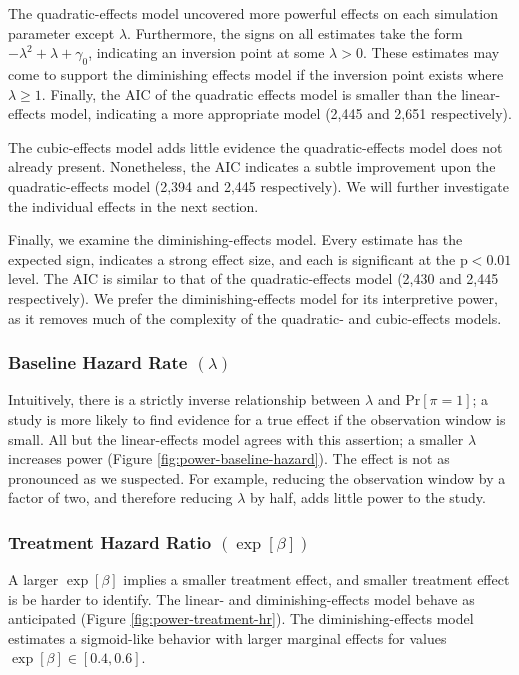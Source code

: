The quadratic-effects model uncovered more powerful effects on each simulation parameter except $\lambda$. Furthermore, the signs on all estimates take the form $-\lambda^2 + \lambda + \gamma_0$, indicating an inversion point at some $\lambda > 0$. These estimates may come to support the diminishing effects model if the inversion point exists where $\lambda \geq 1$. Finally, the AIC of the quadratic effects model is smaller than the linear-effects model, indicating a more appropriate model (2,445 and 2,651 respectively).

The cubic-effects model adds little evidence the quadratic-effects model does not already present. Nonetheless, the AIC indicates a subtle improvement upon the quadratic-effects model (2,394 and 2,445 respectively). We will further investigate the individual effects in the next section. 

Finally, we examine the diminishing-effects model. Every estimate has the expected sign, indicates a strong effect size, and each is significant at the $\text{p} < 0.01$ level. The AIC is similar to that of the quadratic-effects model (2,430 and 2,445 respectively). We prefer the diminishing-effects model for its interpretive power, as it removes much of the complexity of the quadratic- and cubic-effects models.

\subsubsection{Baseline Hazard Rate $(\lambda)$}

Intuitively, there is a strictly inverse relationship between $\lambda$ and $\text{Pr}[\pi = 1]$; a study is more likely to find evidence for a true effect if the observation window is small. All but the linear-effects model agrees with this assertion; a smaller $\lambda$ increases power (Figure \ref{fig:power-baseline-hazard}).  The effect is not as pronounced as we suspected. For example, reducing the observation window by a factor of two, and therefore reducing $\lambda$ by half, adds little power to the study.

\subsubsection{Treatment Hazard Ratio $(\exp[\beta])$}

A larger $\exp[\beta]$ implies a smaller treatment effect\footnotemark, and smaller treatment effect is be harder to identify. The linear- and diminishing-effects model behave as anticipated (Figure \ref{fig:power-treatment-hr}). The diminishing-effects model estimates a sigmoid-like behavior with larger marginal effects for values $\exp[\beta] \in [0.4, 0.6]$. 

